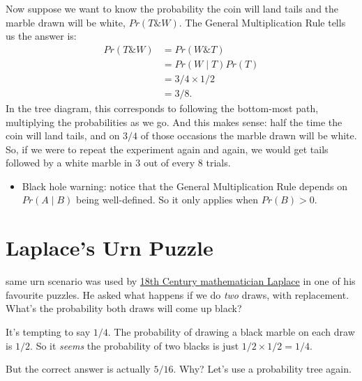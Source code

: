 \documentclass[justified]{tufte-book}
\newcommand{\given}{\mid}
\renewcommand{\wedge}{\mathbin{\&}}
\newcommand{\gt}{>}
\newcommand{\p}{Pr}
\newenvironment{warning}{\begin{itemize}\item[\faBan]}{\end{itemize}}
\theoremstyle{definition}
\theoremstyle{definition}
\theoremstyle{definition}
\theoremstyle{remark}
\begin{document}
Now suppose we want to know the probability the coin will land tails and
the marble drawn will be white, \(\p(T \wedge W)\). The General
Multiplication Rule tells us the answer is: \[
  \begin{aligned}
    \p(T \wedge W) &= \p(W \wedge T)\\
                   &= \p(W \given T) \p(T)\\
                   &= 3/4 \times 1/2\\
                   &= 3/8.
  \end{aligned}
\] In the tree diagram, this corresponds to following the bottom-most
path, multiplying the probabilities as we go. And this makes sense: half
the time the coin will land tails, and on \(3/4\) of those occasions the
marble drawn will be white. So, if we were to repeat the experiment
again and again, we would get tails followed by a white marble in \(3\)
out of every \(8\) trials.

\begin{warning}
Black hole warning: notice that the General Multiplication Rule depends
on \(\p(A \given B)\) being well-defined. So it only applies when
\(\p(B) \gt 0\).
\end{warning}

\hypertarget{laplaces-urn-puzzle}{%
\section{Laplace's Urn Puzzle}\label{laplaces-urn-puzzle}}

 same urn scenario was used by
\protect\hyperlink{strength}{18th Century mathematician Laplace} in one
of his favourite puzzles. He asked what happens if we do \emph{two}
draws, with replacement. What's the probability both draws will come up
black?

It's tempting to say \(1/4\). The probability of drawing a black marble
on each draw is \(1/2\). So it \emph{seems} the probability of two
blacks is just \(1/2 \times 1/2 = 1/4\).

But the correct answer is actually \(5/16\). Why? Let's use a
probability tree again.
\end{document}
